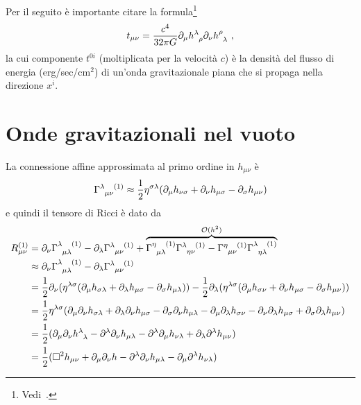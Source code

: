 Per il seguito è importante citare la
formula\footnote{Vedi~\textcite[449]{landau:campi}.}
\begin{equation}
  \label{landau107,11}
  t_{\mu\nu} = \frac{c^{4}}{32\pi G} \partial_{\mu}
  \tensor{h}{^{\lambda}_{\rho}} \partial_{\nu} \tensor{h}{^{\rho}_{\lambda}} \ ,
\end{equation}
la cui componente $t^{0i}$ (moltiplicata per la velocità $c$) è la densità del
flusso di energia (erg/sec/cm$^2$) di un'onda gravitazionale piana che si
propaga nella direzione $x^{i}$.

\section{Onde gravitazionali nel vuoto}
\label{sec:onde-grav-vuoto}

La connessione affine approssimata al primo ordine in $h_{\mu\nu}$ è
\begin{equation}
  \tensor{\Gamma}{^{\lambda}_{\mu\nu}^{(1)}} \approx \frac{1}{2}\eta^{\sigma\lambda}
  (\partial_{\mu}h_{\nu\sigma} + \partial_{\nu}h_{\mu\sigma}
  - \partial_{\sigma}h_{\mu\nu})
\end{equation}
e quindi il tensore di Ricci è dato da
\begin{equation}
  \label{eq:ricci-lineare}
  \begin{split}
    R_{\mu\nu}^{(1)} &= \partial_{\nu}
    \tensor{\Gamma}{^{\lambda}_{\mu\lambda}^{(1)}}
    - \partial_{\lambda} \tensor{\Gamma}{^{\lambda}_{\mu\nu}^{(1)}} +
    \overbrace{\tensor{\Gamma}{^{\eta}_{\mu\lambda}^{(1)}}
      \tensor{\Gamma}{^{\lambda}_{\eta\nu}^{(1)}} -
      \tensor{\Gamma}{^{\eta}_{\mu\nu}^{(1)}}
      \tensor{\Gamma}{^{\lambda}_{\eta\lambda}^{(1)}}}^{\mathcal{O}(h^{2})} \\
    &\approx \partial_{\nu}\tensor{\Gamma}{^{\lambda}_{\mu\lambda}^{(1)}}
    - \partial_{\lambda} \tensor{\Gamma}{^{\lambda}_{\mu\nu}^{(1)}} \\
    &= \frac{1}{2}\partial_{\nu} (\eta^{\lambda\sigma}(\partial_{\mu}
    h_{\sigma\lambda} + \partial_{\lambda}h_{\mu\sigma}
    - \partial_{\sigma}h_{\mu\lambda})) -
    \frac{1}{2}\partial_{\lambda}(\eta^{\lambda\sigma}(\partial_{\mu}h_{\sigma\nu}
    + \partial_{\nu}h_{\mu\sigma} - \partial_{\sigma}h_{\mu\nu})) \\
    &= \frac{1}{2} \eta^{\lambda\sigma}(\partial_{\mu}\partial_{\nu}
    h_{\sigma\lambda} + \partial_{\lambda}\partial_{\nu} h_{\mu\sigma}
    - \partial_{\sigma}\partial_{\nu} h_{\mu\lambda}
    - \partial_{\mu}\partial_{\lambda} h_{\sigma\nu}
    - \partial_{\nu}\partial_{\lambda} h_{\mu\sigma}
    + \partial_{\sigma}\partial_{\lambda} h_{\mu\nu}) \\
    &= \frac{1}{2}(\partial_{\mu}\partial_{\nu}
    \tensor{h}{^{\lambda}_{\lambda}} - \partial^{\lambda}\partial_{\nu}
    h_{\mu\lambda} - \partial^{\lambda}\partial_{\mu} h_{\nu\lambda}
    + \partial_{\lambda}\partial^{\lambda} h_{\mu\nu}) \\
    &= \frac{1}{2} (\dalamb h_{\mu\nu} + \partial_{\mu}\partial_{\nu} h
    - \partial^{\lambda}\partial_{\nu} h_{\mu\lambda}
    - \partial_{\mu}\partial^{\lambda} h_{\nu\lambda})
  \end{split}
\end{equation}
